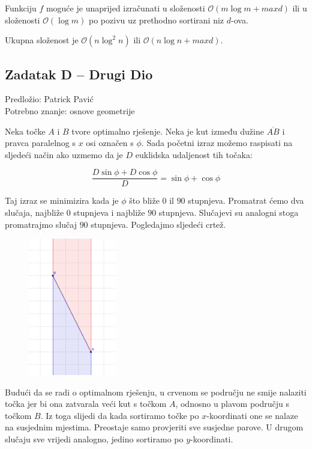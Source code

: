 \documentclass[a4paper]{article}
\begin{document}
Funkciju $f$ moguće je unaprijed izračunati u složenosti $\mathcal{O}(m \log m
+ maxd)$ ili u složenosti $\mathcal{O}(\log m)$ po pozivu uz prethodno
sortirani niz $d$-ova.

Ukupna složenost je $\mathcal{O}(n \log^2 n)$ ili $\mathcal{O}(n \log n + maxd)$.

\subsection*{Zadatak D -- Drugi Dio}
\textsf{Predložio: Patrick Pavić}\\
\textsf{Potrebno znanje: osnove geometrije}

Neka točke $A$ i $B$ tvore optimalno rješenje. Neka je kut između dužine $\overline{AB}$ i
pravca paralelnog s $x$ osi označen s $\phi$. Sada početni izraz možemo raspisati na
sljedeći način ako uzmemo da je $D$ euklidska udaljenost tih točaka:

  \[\frac{D \sin \phi + D \cos \phi}{D} = \sin \phi + \cos \phi\]


Taj izraz se minimizira kada je $\phi$ što bliže $0$ il $90$ stupnjeva. Promatrat
ćemo dva slučaja, najbliže $0$ stupnjeva i najbliže $90$ stupnjeva. Slučajevi su
analogni stoga promatrajmo slučaj $90$ stupnjeva. Pogledajmo sljedeći crtež.

\begin{figure}[h]
  \centering
  \includegraphics[height=6cm]{pic/D_edit.png}
\end{figure}


Budući da se radi o optimalnom rješenju, u crvenom se području ne smije
nalaziti točka jer bi ona zatvarala veći kut s točkom $A$, odnosno u plavom
području s točkom $B$. Iz toga slijedi da kada sortiramo točke po
$x$-koordinati one se nalaze na susjednim mjestima. Preostaje samo provjeriti
sve susjedne parove. U drugom slučaju sve vrijedi analogno, jedino sortiramo po
$y$-koordinati.
\end{document}
